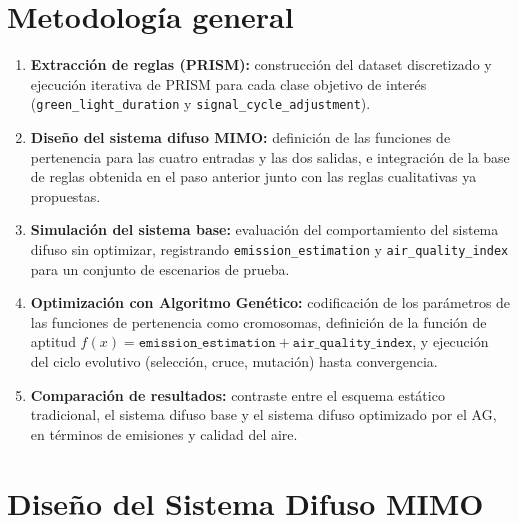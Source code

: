 \documentclass[12pt,a4paper]{article}
\begin{document}

\section{Metodología general}

\begin{enumerate}
 \item \textbf{Extracción de reglas (PRISM):} construcción del
 dataset discretizado y ejecución iterativa de PRISM para cada clase
 objetivo de interés (\texttt{green\_light\_duration} y
 \texttt{signal\_cycle\_adjustment}).
 \item \textbf{Diseño del sistema difuso MIMO:} definición de las
 funciones de pertenencia para las cuatro entradas y las dos salidas,
 e integración de la base de reglas obtenida en el paso anterior junto
 con las reglas cualitativas ya propuestas.
 \item \textbf{Simulación del sistema base:} evaluación del
 comportamiento del sistema difuso sin optimizar, registrando
 \texttt{emission\_estimation} y \texttt{air\_quality\_index} para un
 conjunto de escenarios de prueba.
 \item \textbf{Optimización con Algoritmo Genético:} codificación de
 los parámetros de las funciones de pertenencia como cromosomas,
 definición de la función de aptitud
 $f(x)=\texttt{emission\_estimation}+\texttt{air\_quality\_index}$, y
 ejecución del ciclo evolutivo (selección, cruce, mutación) hasta
 convergencia.
 \item \textbf{Comparación de resultados:} contraste entre el esquema
 estático tradicional, el sistema difuso base y el sistema difuso
 optimizado por el AG, en términos de emisiones y calidad del aire.
\end{enumerate}


\section{Diseño del Sistema Difuso MIMO}
\end{document}
